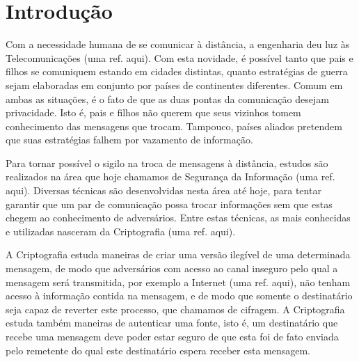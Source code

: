 
\chapter{Introdução}

Com a necessidade humana de se comunicar à distância, a engenharia deu luz às Telecomunicações (uma ref. aqui). Com esta novidade, é possível tanto que pais e filhos se comuniquem estando em cidades distintas, quanto estratégias de guerra sejam elaboradas em conjunto por países de continentes diferentes. Comum em ambas as situações, é o fato de que as duas pontas da comunicação desejam privacidade. Isto é, pais e filhos não querem que seus vizinhos tomem conhecimento das mensagens que trocam. Tampouco, países aliados pretendem que suas estratégias falhem por vazamento de informação.

Para tornar possível o sigilo na troca de mensagens à distância, estudos são realizados na área que hoje chamamos de Segurança da Informação (uma ref. aqui). Diversas técnicas são desenvolvidas nesta área até hoje, para tentar garantir que um par de comunicação possa trocar informações sem que estas chegem ao conhecimento de adversários. Entre estas técnicas, as mais conhecidas e utilizadas nasceram da Criptografia (uma ref. aqui).

A Criptografia estuda maneiras de criar uma versão ilegível de uma determinada mensagem, de modo que adversários com acesso ao canal inseguro pelo qual a mensagem será transmitida, por exemplo a Internet (uma ref. aqui), não tenham acesso à informação contida na mensagem, e de modo que somente o destinatário seja capaz de reverter este processo, que chamamos de cifragem. A Criptografia estuda também maneiras de autenticar uma fonte, isto é, um destinatário que recebe uma mensagem deve poder estar seguro de que esta foi de fato enviada pelo remetente do qual este destinatário espera receber esta mensagem.

